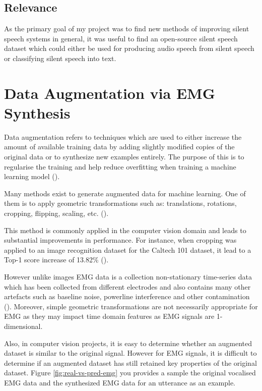 \subsection{Relevance}

As the primary goal of my project was to find new methods of improving silent
speech systems in general, it was useful to find an open-source silent speech
dataset which could either be used for producing audio speech from silent
speech or classifying silent speech into text.

\section{Data Augmentation via EMG Synthesis}

Data augmentation refers to techniques which are used to either increase
the amount of available training data by adding slightly modified
copies of the original data or to synthesize new examples entirely.
The purpose of this is to regularise the training and help reduce overfitting
when training a machine learning model (\cite{data_augmentation_def}).

Many methods exist to generate augmented data for machine learning.
One of them is to apply geometric transformations such as: translations, rotations,
cropping, flipping, scaling, etc. (\cite{data_augmentation_def}).

This method is commonly applied in the computer vision domain and
leads to substantial improvements in performance. For instance,
when cropping was applied to an image recognition dataset for the
Caltech 101 dataset, it lead to a Top-1 score increase of 13.82\%
(\cite{geometric_augment}).

However unlike images EMG data is a collection non-stationary
time-series data which has been collected from different electrodes
and also contains many other artefacts such as baseline noise,
powerline interference and other contamination (\cite{semg_filtering}).
Moreover, simple geometric transformations are not necessarily appropriate
for EMG as they may impact time domain features as EMG signals are
1-dimensional.

Also, in computer vision projects, it is easy to determine whether
an augmented dataset is similar to the original signal. However for EMG
signals, it is difficult to determine if an augmented dataset has still
retained key properties of the original dataset.
Figure \ref{fig:real-vs-pred-emg} you provides a sample the original vocalised
EMG data and the synthesized EMG data for an utterance as an example.

